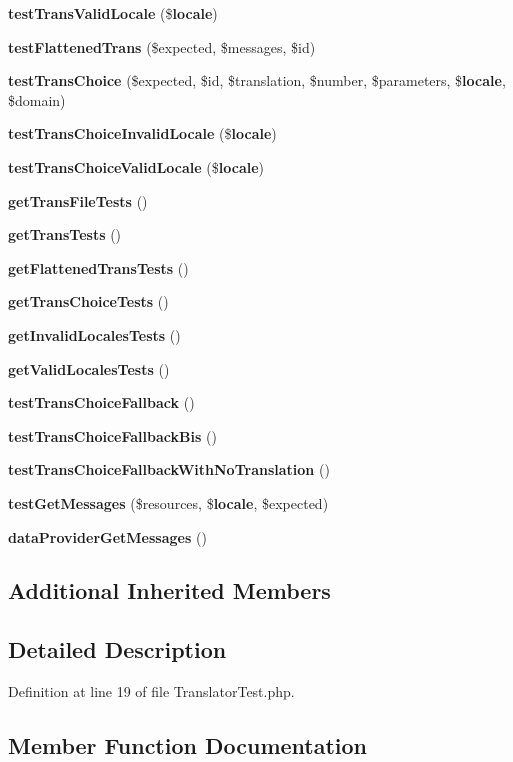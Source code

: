 \begin{DoxyCompactItemize}
{\bf test\+Trans\+Valid\+Locale} (\${\bf locale})
\item 
{\bf test\+Flattened\+Trans} (\$expected, \$messages, \$id)
\item 
{\bf test\+Trans\+Choice} (\$expected, \$id, \$translation, \$number, \$parameters, \${\bf locale}, \$domain)
\item 
{\bf test\+Trans\+Choice\+Invalid\+Locale} (\${\bf locale})
\item 
{\bf test\+Trans\+Choice\+Valid\+Locale} (\${\bf locale})
\item 
{\bf get\+Trans\+File\+Tests} ()
\item 
{\bf get\+Trans\+Tests} ()
\item 
{\bf get\+Flattened\+Trans\+Tests} ()
\item 
{\bf get\+Trans\+Choice\+Tests} ()
\item 
{\bf get\+Invalid\+Locales\+Tests} ()
\item 
{\bf get\+Valid\+Locales\+Tests} ()
\item 
{\bf test\+Trans\+Choice\+Fallback} ()
\item 
{\bf test\+Trans\+Choice\+Fallback\+Bis} ()
\item 
{\bf test\+Trans\+Choice\+Fallback\+With\+No\+Translation} ()
\item 
{\bf test\+Get\+Messages} (\$resources, \${\bf locale}, \$expected)
\item 
{\bf data\+Provider\+Get\+Messages} ()
\end{DoxyCompactItemize}
\subsection*{Additional Inherited Members}


\subsection{Detailed Description}


Definition at line 19 of file Translator\+Test.\+php.



\subsection{Member Function Documentation}
